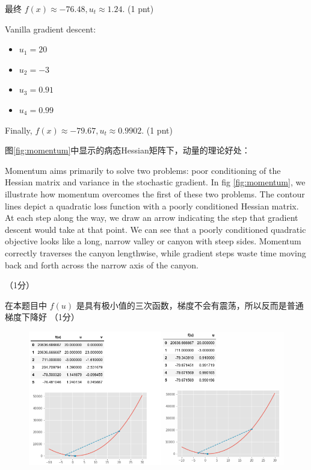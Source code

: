 \documentclass[12pt]{article}
\providecommand{\tightlist}{%
	\setlength{\itemsep}{0pt}\setlength{\parskip}{0pt}}
\begin{document}
最终 $f(x) \approx -76.48, u_t \approx 1.24$.  (1 pnt)

Vanilla gradient descent:

\begin{itemize}
	\tightlist
	\item $u_1=20$
	\item $u_2=-3$
	\item $u_3=0.91$
	\item $u_4=0.99$
\end{itemize}

Finally, $f(x) \approx -79.67, u_t \approx 0.9902$. (1 pnt)

图\ref{fig:momentum}中显示的病态Hessian矩阵下，动量的理论好处：

Momentum aims primarily to solve two problems: poor conditioning of the Hessian matrix and variance in the stochastic gradient. In fig \ref{fig:momentum}, we illustrate how momentum overcomes the first of these two problems. The contour lines depict a quadratic loss function with a poorly conditioned Hessian matrix.  At each step along the way, we draw an arrow indicating the step that gradient descent would take at that point. We can see that a poorly conditioned quadratic objective looks like a long, narrow valley or canyon with steep sides. Momentum correctly traverses the canyon lengthwise, while gradient steps waste time moving back and forth across the narrow axis of the canyon.

（1分）

在本题目中 $f(u)$ 是具有极小值的三次函数，梯度不会有震荡，所以反而是普通梯度下降好 （1分）

\begin{figure}
	\includegraphics[width=\textwidth]{2018-04-23-11-20-50.png}
\end{figure}

\end{document}

